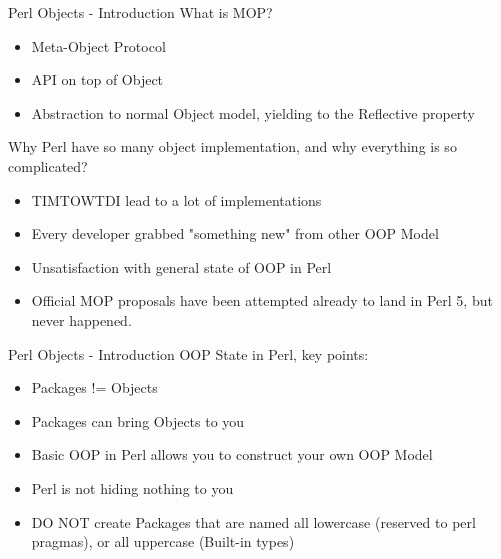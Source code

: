 \documentclass[10pt]{beamer}
\begin{document}
\begin{frame}[fragile]{Perl Objects - Introduction}
What is MOP?
\begin{itemize}
\item Meta-Object Protocol
\item API on top of Object 
\item Abstraction to normal Object model, yielding to the Reflective property
\end{itemize}
Why Perl have so many object implementation, and why everything is so complicated?
\begin{itemize}
\item TIMTOWTDI lead to a lot of implementations
\item Every developer grabbed "something new" from other OOP Model
\item Unsatisfaction with general state of OOP in Perl
\item Official MOP proposals have been attempted already to land in Perl 5, but never happened.
\end{itemize}
\end{frame}

\begin{frame}[fragile]{Perl Objects - Introduction}
OOP State in Perl, key points:
\begin{itemize}
\item Packages != Objects
\item Packages can bring Objects to you
\item Basic OOP in Perl allows you to construct your own OOP Model
\item Perl is not hiding nothing to you
\item DO NOT create Packages that are named all lowercase (reserved to perl pragmas), or all uppercase (Built-in types)
\end{itemize}
\end{frame}

\end{document}
